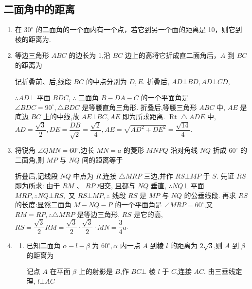 \subsection*{二面角中的距离}
\begin{enumerate}
    \item 在 $30^\circ$ 的二面角的一个面内有一个点，若它到另一个面的距离是 10，则它到棱的距离为.
    \item 等边三角形 ${ABC}$ 的边长为 1,沿 ${BC}$ 边上的高将它折成直二面角后，$A$ 到 ${BC}$ 的距离为 
    \begin{jieda}
        记折叠前、后,线段 ${BC}$ 的中点分别为 $D,E$. 折叠后, ${AD}\bot {BD},{AD}\bot {CD}$,
        
        $\therefore {AD} \bot$ 平面 ${BDC}$, $\therefore$ 二面角 $B - {DA} - C$ 的一个平面角是 $\angle {BDC} = {90}^{ \circ  }, \bigtriangleup  {BDC}$ 是等腰直角三角形. 折叠后,等腰三角形 ${ABC}$ 中, ${AE}$ 是底边 ${BC}$ 上的中线,故 ${AE} \bot  {BC},{AE}$ 即为所求距离. $\operatorname{Rt} \bigtriangleup  {ADE}$ 中, ${AD} = \dfrac{\sqrt{3}}{2},{DE} = \dfrac{DB}{\sqrt{2}} = \dfrac{\sqrt{2}}{4},{AE} = \sqrt{A{D}^{2} + D{E}^{2}} = \dfrac{\sqrt{14}}{4}.$
    \end{jieda}

    \item 将锐角 $\angle {QMN} = {60}^{ \circ  }$,边长 ${MN} = a$ 的菱形 ${MNPQ}$ 沿对角线 ${NQ}$ 折成 ${60}^{ \circ  }$ 的二面角,则 ${MP}$ 与 ${NQ}$ 间的距离等于
    \begin{jieda}
        折叠后,记线段 ${NQ}$ 中点为 $R$,连接 $\bigtriangleup {MRP}$ 三边,并作 ${RS}\bot {MP}$ 于 $S$. 先证 ${RS}$ 即为所求: 由于 ${RM}$ 、 ${RP}$ 相交, 且都与 ${NQ}$ 垂直, $\therefore {NQ} \bot$ 平面 ${MRP},\therefore {NQ} \bot  {RS},$ 又 ${RS} \bot  {MP},\therefore$ 线段 ${RS}$ 是 ${MP}$ 与 ${NQ}$ 的公垂线段. 再求 ${RS}$ 的长度:显然二面角 $M - {NQ} - P$ 的一个平面角是 $\angle {MRP} = {60}^{ \circ  }$,又 ${RM} = {RP},\therefore \bigtriangleup {MRP}$ 是等边三角形, ${RS}$ 是它的高, ${RS} = \dfrac{\sqrt{3}}{2}{RM} = \dfrac{\sqrt{3}}{2} \cdot  \dfrac{\sqrt{3}}{2} \cdot  {MN} = \dfrac{3}{4}a$.
    \end{jieda}

    \item 
    \begin{enumerate}
        \item 已知二面角 $\alpha  - l - \beta$ 为 ${60}^{ \circ  },\alpha$ 内一点 $A$ 到棱 $l$ 的距离为 $2\sqrt{3}$,则 $A$ 到 $\beta$ 的距离为
        \begin{jieda}
            记点 $A$ 在平面 $\beta$ 上的射影是 $B$,作 ${BC} \bot$ 棱 $l$ 于 $C$,连接 ${AC}$. 由三垂线定理, $l \bot  {AC}$


\end{jieda}
\end{enumerate}
\end{enumerate}
